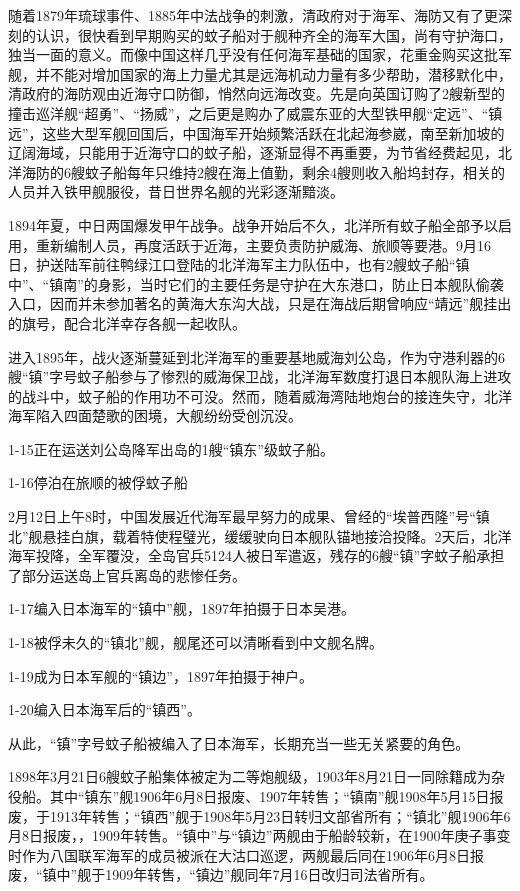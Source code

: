 \documentclass[12pt,UTF8]{ctexbook}
\begin{document}
随着1879年琉球事件、1885年中法战争的刺激，清政府对于海军、海防又有了更深刻的认识，很快看到早期购买的蚊子船对于舰种齐全的海军大国，尚有守护海口，独当一面的意义。而像中国这样几乎没有任何海军基础的国家，花重金购买这批军舰，并不能对增加国家的海上力量尤其是远海机动力量有多少帮助，潜移默化中，清政府的海防观由近海守口防御，悄然向远海改变。先是向英国订购了2艘新型的撞击巡洋舰“超勇”、“扬威”，之后更是购办了威震东亚的大型铁甲舰“定远”、“镇远”，这些大型军舰回国后，中国海军开始频繁活跃在北起海参崴，南至新加坡的辽阔海域，只能用于近海守口的蚊子船，逐渐显得不再重要，为节省经费起见，北洋海防的6艘蚊子船每年只维持2艘在海上值勤，剩余4艘则收入船坞封存，相关的人员并入铁甲舰服役，昔日世界名舰的光彩逐渐黯淡。

1894年夏，中日两国爆发甲午战争。战争开始后不久，北洋所有蚊子船全部予以启用，重新编制人员，再度活跃于近海，主要负责防护威海、旅顺等要港。9月16日，护送陆军前往鸭绿江口登陆的北洋海军主力队伍中，也有2艘蚊子船“镇中”、“镇南”的身影，当时它们的主要任务是守护在大东港口，防止日本舰队偷袭入口，因而并未参加著名的黄海大东沟大战，只是在海战后期曾响应“靖远”舰挂出的旗号，配合北洋幸存各舰一起收队。

进入1895年，战火逐渐蔓延到北洋海军的重要基地威海刘公岛，作为守港利器的6艘“镇”字号蚊子船参与了惨烈的威海保卫战，北洋海军数度打退日本舰队海上进攻的战斗中，蚊子船的作用功不可没。然而，随着威海湾陆地炮台的接连失守，北洋海军陷入四面楚歌的困境，大舰纷纷受创沉没。

1-15正在运送刘公岛降军出岛的1艘“镇东”级蚊子船。

1-16停泊在旅顺的被俘蚊子船

2月12日上午8时，中国发展近代海军最早努力的成果、曾经的“埃普西隆”号“镇北”舰悬挂白旗，载着特使程璧光，缓缓驶向日本舰队锚地接洽投降。2天后，北洋海军投降，全军覆没，全岛官兵5124人被日军遣返，残存的6艘“镇”字蚊子船承担了部分运送岛上官兵离岛的悲惨任务。

1-17编入日本海军的“镇中”舰，1897年拍摄于日本吴港。

1-18被俘未久的“镇北”舰，舰尾还可以清晰看到中文舰名牌。

1-19成为日本军舰的“镇边”，1897年拍摄于神户。

1-20编入日本海军后的“镇西”。

从此，“镇”字号蚊子船被编入了日本海军，长期充当一些无关紧要的角色。

1898年3月21日6艘蚊子船集体被定为二等炮舰级，1903年8月21日一同除籍成为杂役船。其中“镇东”舰1906年6月8日报废、1907年转售；“镇南”舰1908年5月15日报废，于1913年转售；“镇西”舰于1908年5月23日转归文部省所有；“镇北”舰1906年6月8日报废，，1909年转售。“镇中”与“镇边”两舰由于船龄较新，在1900年庚子事变时作为八国联军海军的成员被派在大沽口巡逻，两舰最后同在1906年6月8日报废，“镇中”舰于1909年转售，“镇边”舰同年7月16日改归司法省所有。
\end{document}
